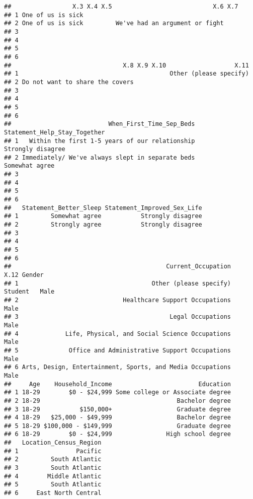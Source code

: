 \documentclass[
]{article}
\begin{document}
\begin{verbatim}
##                 X.3 X.4 X.5                            X.6 X.7
## 1 One of us is sick                                           
## 2 One of us is sick         We've had an argument or fight    
## 3                                                             
## 4                                                             
## 5                                                             
## 6                                                             
##                               X.8 X.9 X.10                   X.11
## 1                                          Other (please specify)
## 2 Do not want to share the covers                                
## 3                                                                
## 4                                                                
## 5                                                                
## 6                                                                
##                           When_First_Time_Sep_Beds Statement_Help_Stay_Together
## 1   Within the first 1-5 years of our relationship            Strongly disagree
## 2 Immediately/ We've always slept in separate beds               Somewhat agree
## 3                                                                              
## 4                                                                              
## 5                                                                              
## 6                                                                              
##   Statement_Better_Sleep Statement_Improved_Sex_Life
## 1         Somewhat agree           Strongly disagree
## 2         Strongly agree           Strongly disagree
## 3                                                   
## 4                                                   
## 5                                                   
## 6                                                   
##                                           Current_Occupation    X.12 Gender
## 1                                     Other (please specify) Student   Male
## 2                             Healthcare Support Occupations           Male
## 3                                          Legal Occupations           Male
## 4             Life, Physical, and Social Science Occupations           Male
## 5              Office and Administrative Support Occupations           Male
## 6 Arts, Design, Entertainment, Sports, and Media Occupations           Male
##     Age    Household_Income                        Education
## 1 18-29        $0 - $24,999 Some college or Associate degree
## 2 18-29                                      Bachelor degree
## 3 18-29           $150,000+                  Graduate degree
## 4 18-29   $25,000 - $49,999                  Bachelor degree
## 5 18-29 $100,000 - $149,999                  Graduate degree
## 6 18-29        $0 - $24,999               High school degree
##   Location_Census_Region
## 1                Pacific
## 2         South Atlantic
## 3         South Atlantic
## 4        Middle Atlantic
## 5         South Atlantic
## 6     East North Central
\end{verbatim}
\end{document}
